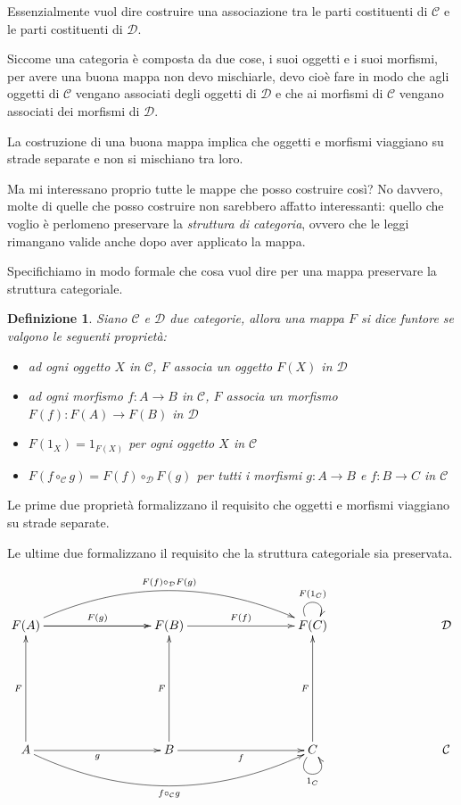 \documentclass[12pt]{article}
\newtheorem{definition}{Definizione}
\begin{document}
Essenzialmente vuol dire costruire una associazione tra le parti costituenti di $\mathcal{C}$ e le parti costituenti di $\mathcal{D}$.

Siccome una categoria è composta da due cose, i suoi oggetti e i suoi morfismi, per avere una buona mappa non devo mischiarle,
devo cioè fare in modo che agli oggetti di $\mathcal{C}$ vengano associati degli oggetti di $\mathcal{D}$ e che ai morfismi di
$\mathcal{C}$ vengano associati dei morfismi di $\mathcal{D}$.

La costruzione di una buona mappa implica che oggetti e morfismi viaggiano su strade separate e non si mischiano tra loro.

Ma mi interessano proprio tutte le mappe che posso costruire così? No davvero, molte di quelle che posso costruire
non sarebbero affatto interessanti: quello che voglio è perlomeno preservare la \emph{struttura di categoria},
ovvero che le leggi rimangano valide anche dopo aver applicato la mappa.

Specifichiamo in modo formale che cosa vuol dire per una mappa preservare la struttura categoriale.

\begin{definition}
Siano $\mathcal{C}$ e $\mathcal{D}$ due categorie, allora una mappa $F$ si dice \emph{funtore} se valgono le seguenti proprietà:

\begin{itemize}
  \item ad ogni oggetto $X$ in $\mathcal{C}$, $F$ associa un oggetto $F(X)$ in $\mathcal{D}$
  \item ad ogni morfismo $f: A \rightarrow B$ in $\mathcal{C}$, $F$ associa un morfismo $F(f): F(A) \rightarrow F(B)$ in $\mathcal{D}$
  \item $F(1_X) = 1_{F(X)}$ per ogni oggetto $X$ in $\mathcal{C}$
  \item $F(f \circ_\mathcal{C} g) = F(f) \circ_\mathcal{D} F(g)$ per tutti i morfismi $g: A \rightarrow B$ e $f: B \rightarrow C$ in $\mathcal{C}$
\end{itemize}

\end{definition}

Le prime due proprietà formalizzano il requisito che oggetti e morfismi viaggiano su strade separate.

Le ultime due formalizzano il requisito che la struttura categoriale sia preservata.

\[
\xymatrixrowsep{3cm}
\xymatrixcolsep{3cm}
\xymatrix{
  F(A) \ar[r]^{F(g)} \ar[r] \ar@/^1cm/[rr]^{F(f) \circ_\mathcal{D} F(g)} & F(B) \ar[r]^{F(f)} & F(C) \ar@(ul,ur)^{F(1_C)} & \mathcal{D} \\
  A \ar[u]^F \ar[r]_g \ar@/_1cm/[rr]_{f \circ_\mathcal{C} g}  & B \ar[u]^F \ar[r]_f & C \ar[u]^F \ar@(dl,dr)_{1_C} & \mathcal{C}
}
\]
\end{document}

